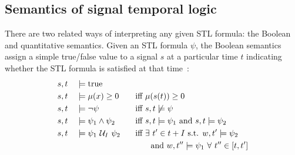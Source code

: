 \subsection{Semantics of signal temporal logic}

There are two related ways of interpreting any given STL formula: the Boolean and quantitative semantics. Given an STL formula $\psi$, the Boolean semantics assign a simple true/false value to a signal $s$ at a particular time $t$ indicating whether the STL formula is satisfied at that time~\cite{donzeEfficientRobustMonitoring2013a}:
\begin{alignat*}{3}
     & s, t &  & \models \text{true}              &  &                                                                            \\
     & s, t &  & \models \mu(x) \geq 0\quad       &  & \text{iff}\ \mu(s(t)) \geq 0                                               \\
     & s, t &  & \models \neg \psi                &  & \text{iff}\ s, t \not\models \psi                                          \\
     & s, t &  & \models \psi_1 \wedge \psi_2     &  & \text{iff}\ s, t \models \psi_1 \text{ and } s, t \models \psi_2           \\
     & s, t &  & \models \psi_1\ \mathcal{U}_I\ \psi_2 &  & \text{iff } \exists\ t' \in t + I \text{ s.t. } w, t' \models \psi_2       \\
     &      &  &                                  &  & \phantom{iff} \text{ and } w, t'' \models \psi_1\ \forall\ t'' \in [t, t']
\end{alignat*}

